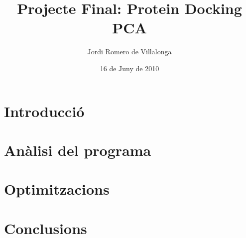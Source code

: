 \documentclass[a4paper]{report}
\author{Jordi Romero de Villalonga}
\title{Projecte Final: Protein Docking \\ PCA}
\date{16 de Juny de 2010}
\begin{document}
\maketitle

\setcounter{page}{0}
\tableofcontents

\chapter{Introducció}


\chapter{Anàlisi del programa}


\chapter{Optimitzacions}


\chapter{Conclusions}


% 
\end{document}

